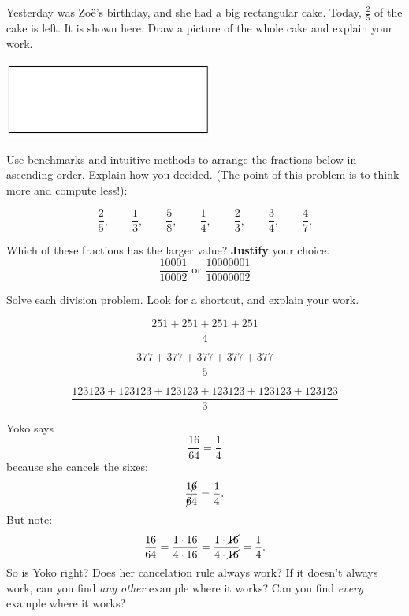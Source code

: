 \begin{problem}
Yesterday was Zo\"e's birthday, and she had a big rectangular cake.  Today, $\frac 2 5$ of the cake is left.  It is shown here. Draw a picture of the whole cake and explain your work.


\bigskip
\begin{center}
\includegraphics[height=2.5cm]{cake}
\end{center}

\end{problem}



\begin{problem}
Use benchmarks and intuitive methods to arrange the fractions below in ascending order. Explain how you decided. (The point of this problem is to think more and compute less!):

\[
\frac 2 5 , \quad\quad \frac 1 3 , \quad\quad\frac 5 8 , \quad\quad \frac 1 4 , \quad \quad\frac 2 3 , \quad\quad  \frac 3 4, \quad\quad \frac 4 7.
\]

\end{problem}


\begin{problem}
Which of these fractions has the larger value?   {\bf Justify} your choice.  
\[
\frac{10001}{10002}   \text{  or }    \frac{10000001}{10000002}
\]

\end{problem}


\begin{problem}[Quick!]
Solve each division problem.  Look for a shortcut, and explain your work.

\[
\frac{251 + 251 + 251 +251}{4}
\]



\[
\frac{377 + 377 + 377 + 377 + 377}{5}
\]


\[
\frac{123123 + 123123 + 123123 + 123123 + 123123 + 123123}{3}
\]

\end{problem}



\begin{problem}[Cancellation]

Yoko says
\[
\frac{16}{64} = \frac 1 4
\]
because she cancels the sixes:
\[
\frac{1\cancel{6}}{\cancel{6}4} = \frac 1 4.
\]
But note:
\[
\frac{16}{64} = \frac{1 \cdot 16}{4\cdot 16} = \frac{1 \cdot \cancel{16}}{4\cdot \cancel{16}} = \frac 1 4.
\]
So is Yoko right?  Does her cancelation rule always work?
If it doesn't always work, can you find \emph{any other} example where it works?  Can you find \emph{every} example where it works?

\end{problem}

